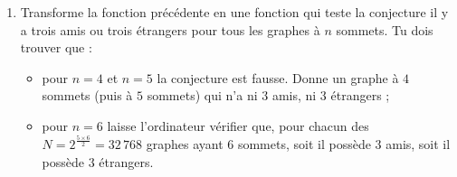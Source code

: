 \documentclass[11pt,class=report,crop=false]{standalone}
\begin{document}
\begin{activite}[Théorème de Ramsey pour $n=6$]
\begin{enumerate}
  
  \item Transforme la fonction précédente en une fonction 
qui teste la conjecture \og{}il y a trois amis ou trois étrangers\fg{} pour tous les graphes à $n$ sommets.
Tu dois trouver que :
\begin{itemize}
\item pour $n=4$ et $n=5$ la conjecture est fausse. Donne un graphe à $4$ sommets (puis à $5$ sommets) qui n'a ni $3$ amis, ni $3$ étrangers ;
\item pour $n=6$ laisse l'ordinateur vérifier que, pour chacun des $N = 2^{\frac{5 \times 6}{2}} = 32\,768$ graphes ayant $6$ sommets, soit il possède $3$ amis, soit il possède $3$ étrangers.
\end{itemize}
\end{enumerate}   
     
\end{activite}
\end{document}
